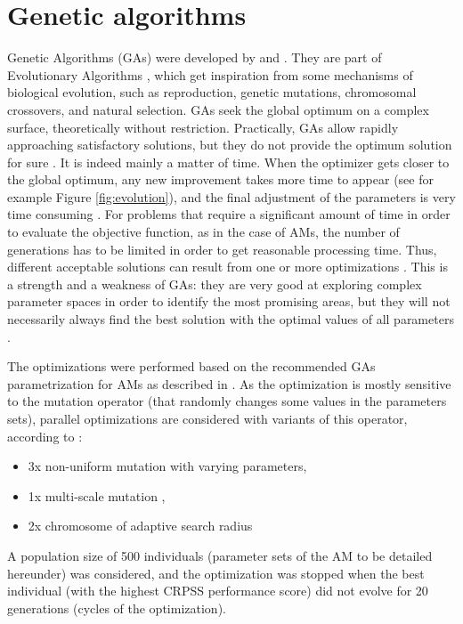 \documentclass[review]{elsarticle}
\begin{document}
\section{Genetic algorithms}
\label{sec:gas}

Genetic Algorithms (GAs) were developed by \citet{Holland1992b} and \citet{Goldberg1989}. They are part of Evolutionary Algorithms \citep{Back1993b, Schwefel1993}, which get inspiration from some mechanisms of biological evolution, such as reproduction, genetic mutations, chromosomal crossovers, and natural selection. GAs seek the global optimum on a complex surface, theoretically without restriction. Practically, GAs allow rapidly approaching satisfactory solutions, but they do not provide the optimum solution for sure \citep{Zitzler2004a}. It is indeed mainly a matter of time. When the optimizer gets closer to the global optimum, any new improvement takes more time to appear (see for example Figure \ref{fig:evolution}), and the final adjustment of the parameters is very time consuming \citep{Back1993a}. For problems that require a significant amount of time in order to evaluate the objective function, as in the case of AMs, the number of generations has to be limited in order to get reasonable processing time. Thus, different acceptable solutions can result from one or more optimizations \citep{Holland1992b}. This is a strength and a weakness of GAs: they are very good at exploring complex parameter spaces in order to identify the most promising areas, but they will not necessarily always find the best solution with the optimal values of all parameters \citep{Holland1992b}.

The optimizations were performed based on the recommended GAs parametrization for AMs as described in \citet{Horton2016a}. As the optimization is mostly sensitive to the mutation operator (that randomly changes some values in the parameters sets), parallel optimizations are considered with variants of this operator, according to \citet{Horton2016a}:

\begin{itemize}
	\item 3x non-uniform mutation \citep{Michalewicz1996} with varying parameters,
	\item 1x multi-scale mutation \citep{Horton2016a},
	\item 2x chromosome of adaptive search radius \citep{Horton2016a}
\end{itemize}

A population size of 500 individuals (parameter sets of the AM to be detailed hereunder) was considered, and the optimization was stopped when the best individual (with the highest CRPSS performance score) did not evolve for 20 generations (cycles of the optimization).
\end{document}
